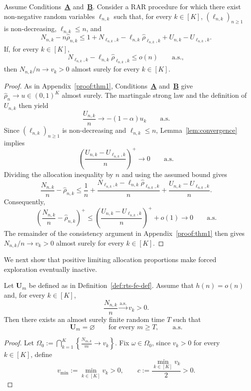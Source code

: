 {{\color{revisiongreen}\begin{lemma}\label{lem:generic-two-stage}
Assume Conditions~\hyperlink{CA}{\textbf{A}} and~\hyperlink{CB}{\textbf{B}}. Consider a RAR procedure for which there exist non-negative random variables \(\ell_{n,k}\) such that, for every \(k\in[K]\), \((\ell_{n,k})_{n\geq1}\) is non-decreasing, \(\ell_{n,k}\leq n\), and
\[
N_{n,k}-n\hat\rho_{n,k}
\leq 1+N_{\ell_{n,k},k}-\ell_{n,k}\hat\rho_{\ell_{n,k},k}
+U_{n,k}-U_{\ell_{n,k},k}.
\]
If, for every \(k\in[K]\),
\[
N_{\ell_{n,k},k}-\ell_{n,k}\hat\rho_{\ell_{n,k},k}
\leq o(n)\qquad\text{a.s.},
\]
then \(N_{n,k}/n\to v_k>0\) almost surely for every \(k\in[K]\).
\end{lemma}
\begin{proof}
As in Appendix~\ref{proof:thm1}, Conditions~\hyperlink{CA}{\textbf{A}} and~\hyperlink{CB}{\textbf{B}} give \(\hat\rho_n\to u\in(0,1)^K\) almost surely. The martingale strong law and the definition of \(U_{n,k}\) then yield
\[
\frac{U_{n,k}}{n}\longrightarrow -(1-\alpha)u_k\qquad\text{a.s.}
\]
Since \((\ell_{n,k})_{n\geq1}\) is non-decreasing and \(\ell_{n,k}\leq n\), Lemma~\ref{lem:convergence} implies
\[
\left(\frac{U_{n,k}-U_{\ell_{n,k},k}}{n}\right)^+
\longrightarrow0\qquad\text{a.s.}
\]
Dividing the allocation inequality by \(n\) and using the assumed bound gives
\[
\frac{N_{n,k}}n-\hat\rho_{n,k}
\leq \frac1n+
\frac{N_{\ell_{n,k},k}-\ell_{n,k}\hat\rho_{\ell_{n,k},k}}n
+\frac{U_{n,k}-U_{\ell_{n,k},k}}n.
\]
Consequently,
\[
\left(\frac{N_{n,k}}n-\hat\rho_{n,k}\right)^+
\leq
\left(\frac{U_{n,k}-U_{\ell_{n,k},k}}n\right)^+
+o(1)\longrightarrow0\qquad\text{a.s.}
\]
The remainder of the consistency argument in Appendix~\ref{proof:thm1} then gives \(N_{n,k}/n\to v_k>0\) almost surely for every \(k\in[K]\).
\end{proof}}

{\color{revisiongreen}We next show that positive limiting allocation proportions make forced exploration eventually inactive.}

\begin{lemma}\label{lem:fe-inactivity}
Let \(\mathbf U_m\) be defined as in Definition~\ref{def:rts-fe-def}. Assume that \(h(n)=o(n)\) and, for every \(k\in[K]\),
\[
\frac{N_{n,k}}n\xrightarrow{\mathrm{a.s.}}v_k>0.
\]
Then there exists an almost surely finite random time \(T\) such that
\[
\mathbf U_m=\varnothing\qquad\text{for every }m\geq T,
\qquad\text{a.s.}
\]
\end{lemma}
\begin{proof}
Let
		\(
		\Omega_0
		:=
		\bigcap_{k=1}^K
		\left\{
		\frac{N_{m,k}}{m}\to v_k
		\right\}.
		\)
		Fix $\omega\in\Omega_0$, since $v_k>0$ for every
		$k\in[K]$, define
		\[
		v_{\min}:=\min_{k\in[K]}v_k>0,
		\qquad
		c:=\frac{\min_{k\in[K]}v_k}{2}>0.
		\]
		

\end{proof}}
